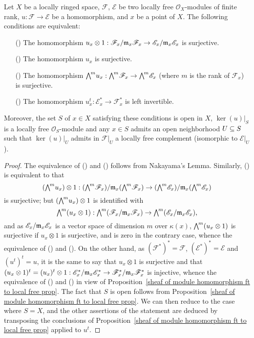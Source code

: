 \begin{corollary}\label{sheaf of module local free surjective iff}
Let $X$ be a locally ringed space, $\mathscr{F}$, $\mathscr{E}$ be two locally free $\mathscr{O}_X$-modules of finite rank, $u:\mathscr{F}\to\mathscr{E}$ be a homomorphism, and $x$ be a point of $X$. The following conditions are equivalent:
\begin{itemize}
\item[(\rmnum{1})] The homomorphism $u_x\otimes 1:\mathscr{F}_x/\mathfrak{m}_x\mathscr{F}_x\to\mathscr{E}_x/\mathfrak{m}_x\mathscr{E}_x$ is surjective.
\item[(\rmnum{2})] The homomorphism $u_x$ is surjective.
\item[(\rmnum{3})] The homomorphism $\bigw^mu_x:\bigw^m\mathscr{F}_x\to\bigw^m\mathscr{E}_x$ (where $m$ is the rank of $\mathscr{F}_x$) is surjective.
\item[(\rmnum{4})] The homomorphism $u_x^{t}:\mathscr{E}_x^*\to\mathscr{F}_x^*$ is left invertible.
\end{itemize}
Moreover, the set $S$ of $x\in X$ satisfying these conditions is open in $X$, $\ker(u)|_S$ is a locally free $\mathscr{O}_S$-module and any $x\in S$ admits an open neighborhood $U\subseteq S$ such that $\ker(u)|_U$ admits in $\mathscr{F}|_U$ a locally free complement (isomorphic to $\mathscr{E}|_U$). 
\end{corollary}
\begin{proof}
The equivalence of () and () follows from Nakayama's Lemma. Similarly, () is equivalent to that
\[(\bigw^mu_x)\otimes 1:(\bigw^m\mathscr{F}_x)/\m_x(\bigw^m\mathscr{F}_x)\to(\bigw^m\mathscr{E}_x)/\m_x(\bigw^m\mathscr{E}_x)\]
is surjective; but $(\bigw^mu_x)\otimes 1$ is identified with
\[\bigw^m(u_x\otimes 1):\bigw^m(\mathscr{F}_x/\m_x\mathscr{F}_x)\to\bigw^m(\mathscr{E}_x/\m_x\mathscr{E}_x),\]
and as $\mathscr{E}_x/\mathfrak{m}_x\mathscr{E}_x$ is a vector space of dimension $m$ over $\kappa(x)$, $\bigw^m(u_x\otimes 1)$ is surjective if $u_x\otimes 1$ is surjective, and is zero in the contrary case, whence the equivalence of () and (). On the other hand, as $(\mathscr{F}^*)^*=\mathscr{F}$, $(\mathscr{E}^*)^*=\mathscr{E}$ and $(u^{t})^{t}=u$, it is the same to say that $u_x\otimes 1$ is surjective and that $(u_x\otimes 1)^t=(u_x)^t\otimes 1:\mathscr{E}_x^*/\mathfrak{m}_x\mathscr{E}_x^*\to\mathscr{F}_x^*/\mathfrak{m}_x\mathscr{F}_x^*$ is injective, whence the equivalence of () and () in view of Proposition~\ref{sheaf of module homomorphism ft to local free prop}. The fact that $S$ is open follows from Proposition~\ref{sheaf of module homomorphism ft to local free prop}. We can then reduce to the case where $S=X$, and the other assertions of the statement are deduced by transposing the conclusions of Proposition~\ref{sheaf of module homomorphism ft to local free prop} applied to $u^t$.
\end{proof}
